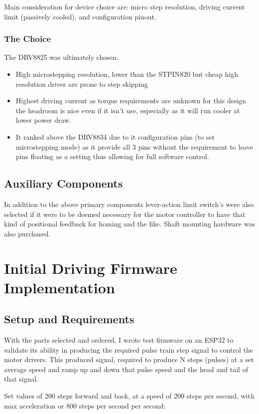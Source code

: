 Main consideration for device choice are: micro step resolution, driving current limit (passively cooled), and configuration pinout.

\subsubsection*{The Choice}
The DRV8825 was ultimately chosen. 
\begin{itemize}
    \item High microstepping resolution, lower than the STPIN820 but cheap high resolution driver are prone to step skipping \cite{step_book}
    \item Highest driving current as torque requirements are unknown for this design the headroom is nice even if it isn't use, especially as it will run cooler at lower power draw. 
    \item It ranked above the DRV8834 due to it configuration pins (to set microstepping mode) as it provide all 3 pins without the requirement to leave pins floating as a setting thus allowing for full software control.
\end{itemize}

\subsection{Auxiliary Components}
In addition to the above primary components lever-action limit switch's were also selected if it were to be deemed necessary for the motor controller to have that kind of positional feedback for homing and the like. Shaft mounting hardware was also purchased.

\newpage
\section{Initial Driving Firmware Implementation}
\subsection{Setup and Requirements}
With the parts selected and ordered, I wrote test firmware on an ESP32 to validate its ability in producing the required pulse train step signal to control the motor drivers. This produced signal, required to produce N steps (pulses) at a set average speed and ramp up and down that pulse speed and the head and tail of that signal.

Set values of 200 steps forward and back, at a speed of 200 steps per second, with max acceleration or 800 steps per second per second:


